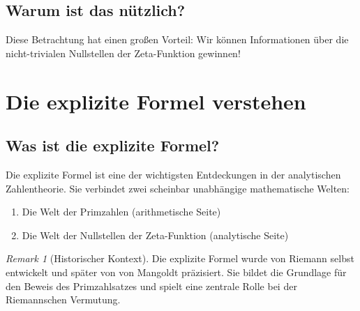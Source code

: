 \documentclass[11pt,a4paper]{article}
\newcommand{\Hxi}{\mathcal{H}_{\xi}}
\newcommand{\Hlocal}{\mathcal{H}_{\mathrm{loc}}}
\newcommand{\Hdual}{\mathcal{H}_{\mathrm{dual}}}
\theoremstyle{definition}
\theoremstyle{remark}
\newtheorem{remark}[definition]{Remark}
\begin{document}
	\subsection{Warum ist das n\"utzlich?}
	
	Diese Betrachtung hat einen gro\ss en Vorteil: Wir k\"onnen Informationen \"uber die
	nicht-trivialen Nullstellen der Zeta-Funktion gewinnen!
	
	\begin{center}
	\end{center}
	
	\section{Die explizite Formel verstehen}\label{sec:explizite_formel}
	
	\subsection{Was ist die explizite Formel?}
	
	Die explizite Formel ist eine der wichtigsten Entdeckungen in der analytischen Zahlentheorie.
	Sie verbindet zwei scheinbar unabh\"angige mathematische Welten:
	\begin{enumerate}
		\item Die Welt der Primzahlen (arithmetische Seite)
		\item Die Welt der Nullstellen der Zeta-Funktion (analytische Seite)
	\end{enumerate}
	
	\begin{remark}[Historischer Kontext]
		Die explizite Formel wurde von Riemann selbst entwickelt und sp\"ater von
		von Mangoldt pr\"azisiert. Sie bildet die Grundlage f\"ur den Beweis des Primzahlsatzes
		und spielt eine zentrale Rolle bei der Riemannschen Vermutung.
	\end{remark}
	
\end{document}
